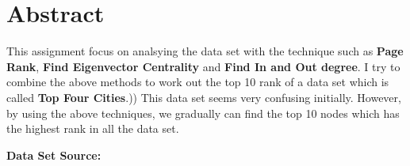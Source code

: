 \documentclass[titlepage,a4paper,12pt,thmsb]{report}
\begin{document}
\chapter*{Abstract}
This assignment focus on analsying the data set with the technique such as {\bf Page Rank}, {\bf Find Eigenvector Centrality} and {\bf Find In and Out degree}. I try to combine the above methods to work out the top 10 rank of a data set which is called {\bf Top Four Cities}.))
This data set seems very confusing initially. However, by using the above techniques, we gradually can find the top 10 nodes which has the highest rank in all the data set.




{\large \bf {Data Set Source:}}
\newline{}
{ }
\newline{}
\vspace{0.5cm}






\newpage
\end{document}
